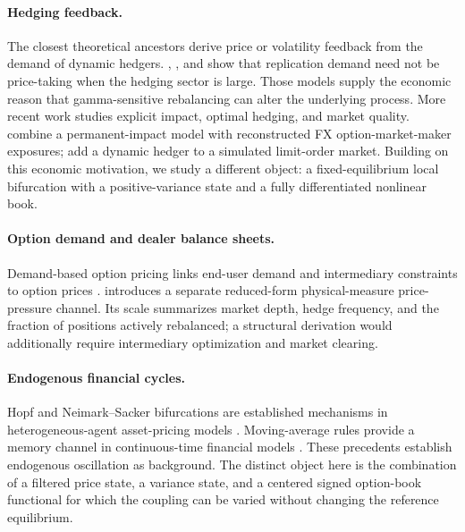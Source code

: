 \documentclass[11pt]{article}
\begin{document}
\paragraph{Hedging feedback.}
The closest theoretical ancestors derive price or volatility feedback from the demand of
dynamic hedgers.  \citet{freystremme1997}, \citet{sircarpapanicolaou1998}, and
\citet{platenschweizer1998} show that replication demand need not be price-taking when the
hedging sector is large.  Those models supply the economic reason that gamma-sensitive
rebalancing can alter the underlying process.  More recent work studies explicit impact,
optimal hedging, and market quality.  \citet{anderegg2022impact} combine a permanent-impact
model with reconstructed FX option-market-maker exposures; \citet{buis2024gamma} add a
dynamic hedger to a simulated limit-order market.  Building on this economic motivation, we
study a different object: a fixed-equilibrium local bifurcation with a positive-variance
state and a fully differentiated nonlinear book.

\paragraph{Option demand and dealer balance sheets.}
Demand-based option pricing links end-user demand and intermediary constraints to option
prices \citep{garleanu2009demand}.   introduces a separate reduced-form
physical-measure price-pressure channel.  Its scale summarizes market depth, hedge frequency,
and the fraction of positions actively rebalanced; a structural derivation would additionally
require intermediary optimization and market clearing.

\paragraph{Endogenous financial cycles.}
Hopf and Neimark--Sacker bifurcations are established mechanisms in heterogeneous-agent
asset-pricing models \citep{brockhommes1998,heli2009,brockhommeswagener2009}.  Moving-average
rules provide a memory channel in continuous-time financial models
\citep{hezheng2010moving}.  These precedents establish endogenous oscillation as background.
The distinct object here is the combination of a filtered price state, a
variance state, and a centered signed option-book functional for which the coupling can be
varied without changing the reference equilibrium.
\end{document}
